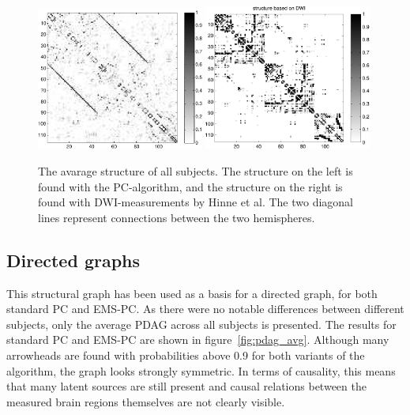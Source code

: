 \documentclass[a4paper, 10pt, english, onecolumn]{article}
\begin{document}
\begin{figure}[h!]
  \centering
  \includegraphics[width=0.49\textwidth]{images/struct_full}
  \includegraphics[width=0.49\textwidth]{images/structure_max}
  \caption{The avarage structure of all subjects. The structure on the left is found with the PC-algorithm, and the structure on the right is found with DWI-measurements by Hinne et al. The two diagonal lines represent connections between the two hemispheres.}
\label{fig:struct_avg}
\end{figure}

\subsection{Directed graphs}
This structural graph has been used as a basis for a directed graph, for both standard PC and EMS-PC.
As there were no notable differences between different subjects, only the average PDAG across all subjects is presented.
The results for standard PC and EMS-PC are shown in figure~\ref{fig:pdag_avg}.
Although many arrowheads are found with probabilities above 0.9 for both variants of the algorithm, the graph looks strongly symmetric.
In terms of causality, this means that many latent sources are still present and causal relations between the measured brain regions themselves are not clearly visible.
\end{document}
